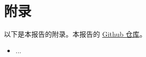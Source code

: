 \documentclass{article}
\begin{document}
\newpage
\section{附录}

\appendix

以下是本报告的附录。本报告的 \href{https://github.com/QA-Team-lo/dbtest}{Github 仓库}。

\begin{itemize}
    \item ...
\end{itemize}

\end{document}
